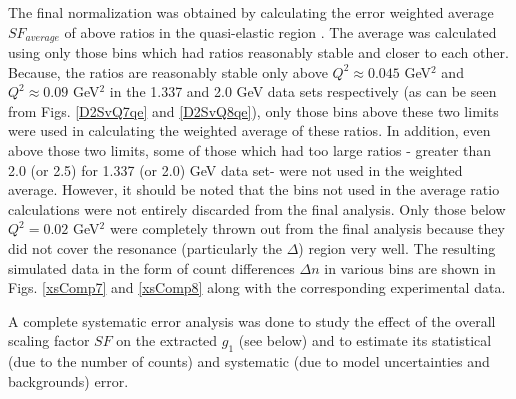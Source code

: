 The final normalization was obtained by calculating the error weighted average $SF_{average}$ of above ratios in the quasi-elastic region%
. %
The average was calculated using only those \qsqs bins which had ratios reasonably stable and closer to each other. %
Because, the ratios are reasonably stable only above $Q^2\approx 0.045$ GeV$^2$ and $Q^2 \approx 0.09$ GeV$^2$ in the 1.337 and 2.0 GeV data sets respectively (as can be seen from Figs. \ref{D2SvQ7qe} and \ref{D2SvQ8qe}), only those \qsqs bins above these two limits were used in calculating the weighted average of these ratios. In addition, even above those two limits, some of those which had too large ratios - greater than 2.0 (or 2.5) for 1.337 (or 2.0) GeV data set-  were not used in the weighted average. However, it should be noted that the bins not used in the average ratio calculations were not entirely discarded from the final analysis. Only those below $Q^2=0.02$ GeV$^2$ were completely thrown out from the final analysis because they did not cover the resonance (particularly the $\Delta$) region very well.
The resulting simulated data in the form of count differences $\Delta n$ in various \qsqs bins are %
shown in Figs. \ref{xsComp7} and \ref{xsComp8} along with the corresponding experimental data. %

A complete systematic error analysis was done to study the effect of the overall scaling factor $SF$ %
on the extracted $g_1$ (see below) and to estimate its statistical (due to the number of counts) and systematic (due to model uncertainties and backgrounds) error. 


